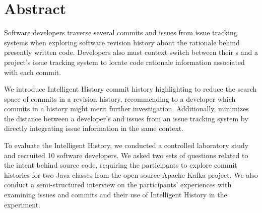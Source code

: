 
\chapter{Abstract}


Software developers traverse several commits and issues from issue tracking systems 
when exploring software revision history  about the rationale behind presently written code.
Developers also must context switch between their s and a project's 
issue tracking system to locate code rationale information associated with each commit.

We introduce Intelligent History commit history highlighting to reduce the search space of 
commits in a revision history, recommending to a developer which commits in a history might merit further investigation.
Additionally,  minimizes the distance between a developer's  and issues from an issue tracking system
by directly integrating issue information in the same context.

To evaluate the Intelligent History, we conducted a controlled laboratory study and recruited 10 software developers.
We asked two sets of questions related to the intent behind source code, requiring the participants to explore 
commit histories for two Java classes from the open-source Apache Kafka project.
We also conduct a semi-structured interview on the participants' experiences with examining issues and commits 
and their use of Intelligent History in the experiment.

